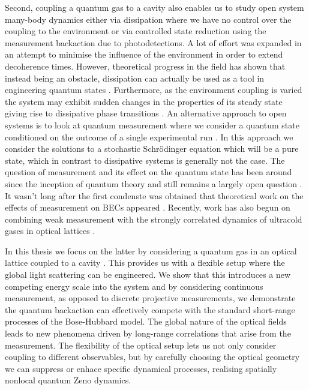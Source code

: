 Second, coupling a quantum gas to a cavity also enables us to study
open system many-body dynamics either via dissipation where we have no
control over the coupling to the environment or via controlled state
reduction using the measurement backaction due to photodetections. A
lot of effort was expanded in an attempt to minimise the influence of
the environment in order to extend decoherence times. However,
theoretical progress in the field has shown that instead being an
obstacle, dissipation can actually be used as a tool in engineering
quantum states \cite{diehl2008}. Furthermore, as the environment
coupling is varied the system may exhibit sudden changes in the
properties of its steady state giving rise to dissipative phase
transitions \cite{carmichael1980, werner2005, capriotti2005,
  morrison2008, eisert2010, bhaseen2012, diehl2010,
  vznidarivc2011}. An alternative approach to open systems is to look
at quantum measurement where we consider a quantum state conditioned
on the outcome of a single experimental run \cite{carmichael,
  MeasurementControl}. In this approach we consider the solutions to a
stochastic Schr\"{o}dinger equation which will be a pure state, which
in contrast to dissipative systems is generally not the case. The
question of measurement and its effect on the quantum state has been
around since the inception of quantum theory and still remains a
largely open question \cite{zurek2002}. It wasn't long after the first
condenste was obtained that theoretical work on the effects of
measurement on BECs appeared \cite{cirac1996, castin1997,
  ruostekoski1997}. Recently, work has also begun on combining weak
measurement with the strongly correlated dynamics of ultracold gases
in optical lattices \cite{mekhov2009prl, mekhov2009pra, mekhov2012,
  douglas2012, douglas2013, ashida2015, ashida2015a}.

In this thesis we focus on the latter by considering a quantum gas in
an optical lattice coupled to a cavity \cite{mekhov2012}. This
provides us with a flexible setup where the global light scattering
can be engineered. We show that this introduces a new competing energy
scale into the system and by considering continuous measurement, as
opposed to discrete projective measurements, we demonstrate the
quantum backaction can effectively compete with the standard
short-range processes of the Bose-Hubbard model. The global nature of
the optical fields leads to new phenomena driven by long-range
correlations that arise from the measurement. The flexibility of the
optical setup lets us not only consider coupling to different
observables, but by carefully choosing the optical geometry we can
suppress or enhace specific dynamical processes, realising spatially
nonlocal quantum Zeno dynamics.

